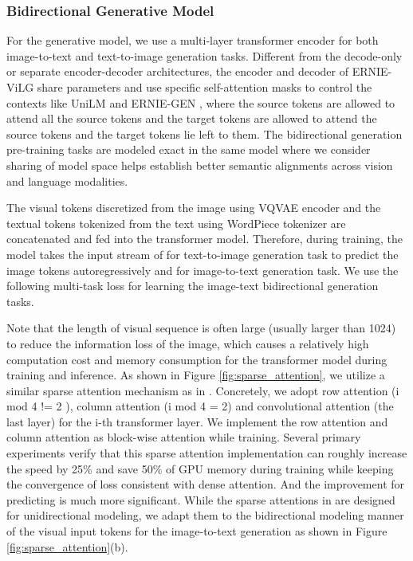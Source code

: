 \documentclass{article}
\begin{document}
\subsubsection{Bidirectional Generative Model}
For the generative model, we use a multi-layer transformer encoder for both image-to-text and text-to-image generation tasks. 
Different from the decode-only \cite{ramesh2021zero, ding2021cogview} or separate encoder-decoder \cite{wu2021n} architectures, the encoder and decoder of ERNIE-ViLG share parameters and use specific self-attention masks to control the contexts like UniLM \cite{dong2019unilm} and ERNIE-GEN \cite{xiao2020ernie-gen}, where the source tokens are allowed to attend all the source tokens and the target tokens are allowed to attend the source tokens and the target tokens lie left to them. The bidirectional generation pre-training tasks are modeled exact in the same model where we consider sharing of model space helps establish better semantic alignments across vision and language modalities.

The visual tokens  discretized from the image using VQVAE encoder and the textual tokens  tokenized from the text using WordPiece tokenizer are concatenated and fed into the transformer model. Therefore, during training, the model takes the input stream of  for text-to-image generation task to predict the image tokens autoregressively and  for image-to-text generation task. 
We use the following multi-task loss for learning the image-text bidirectional generation tasks.




Note that the length  of visual sequence  is often large (usually larger than 1024) to reduce the information loss of the image, which causes a relatively high computation cost and memory consumption for the transformer model during training and inference. As shown in Figure \ref{fig:sparse_attention}, we utilize a similar sparse attention mechanism as in \cite{ramesh2021zero}. Concretely, we adopt row attention (i mod 4 != 2 ),  column attention (i mod 4 = 2) and convolutional attention (the last layer) for the i-th transformer layer. We implement the row attention and column attention as block-wise attention while training. Several primary experiments verify that this sparse attention implementation can roughly increase the speed by 25\% and save 50\% of GPU memory during training while keeping the convergence of loss consistent with dense attention. And the improvement for predicting is much more significant. While the sparse attentions in \cite{ramesh2021zero} are designed for unidirectional modeling, we adapt them to the bidirectional modeling manner of the visual input tokens for the image-to-text generation as shown in Figure \ref{fig:sparse_attention}(b). 
\end{document}
